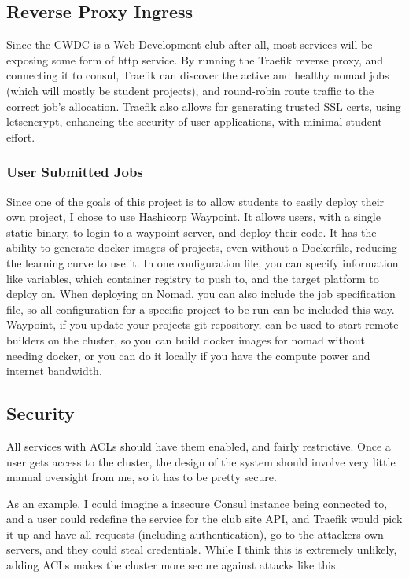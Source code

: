 \documentclass{article}
\begin{document}
\subsection{Reverse Proxy Ingress}
Since the CWDC is a Web Development club after all, most services will be exposing some form of http service. By running the Traefik reverse proxy, and connecting it to consul, Traefik can discover the active and healthy nomad jobs (which will mostly be student projects), and round-robin route traffic to the correct job's allocation. Traefik also allows for generating trusted SSL certs, using letsencrypt, enhancing the security of user applications, with minimal student effort.

\subsubsection{User Submitted Jobs}
Since one of the goals of this project is to allow students to easily deploy their own project, I chose to use Hashicorp Waypoint. It allows users, with a single static binary, to login to a waypoint server, and deploy their code. It has the ability to generate docker images of projects, even without a Dockerfile, reducing the learning curve to use it. In one configuration file, you can specify information like variables, which container registry to push to, and the target platform to deploy on. When deploying on Nomad, you can also include the job specification file, so all configuration for a specific project to be run can be included this way. Waypoint, if you update your projects git repository, can be used to start remote builders on the cluster, so you can build docker images for nomad without needing docker, or you can do it locally if you have the compute power and internet bandwidth.
\subsection{Security}
All services with ACLs should have them enabled, and fairly restrictive. Once a user gets access to the cluster, the design of the system should involve very little manual oversight from me, so it has to be pretty secure.

As an example, I could imagine a insecure Consul instance being connected to, and a user could redefine the service for the club site API, and Traefik would pick it up and have all requests (including authentication), go to the attackers own servers, and they could steal credentials. While I think this is extremely unlikely, adding ACLs makes the cluster more secure against attacks like this.
\end{document}
